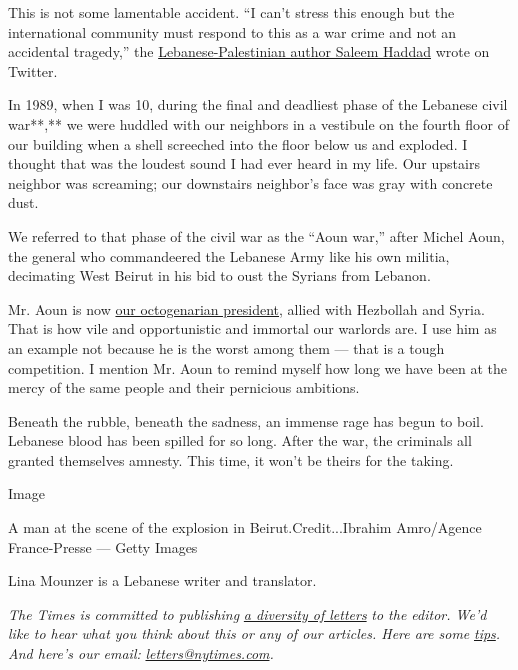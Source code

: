 This is not some lamentable accident. ``I can't stress this enough but
the international community must respond to this as a war crime and not
an accidental tragedy,'' the
\href{https://twitter.com/sysh/status/1290980055544475650}{Lebanese-Palestinian
author Saleem Haddad} wrote on Twitter.

In 1989, when I was 10, during the final and deadliest phase of the
Lebanese civil war**,** we were huddled with our neighbors in a
vestibule on the fourth floor of our building when a shell screeched
into the floor below us and exploded. I thought that was the loudest
sound I had ever heard in my life. Our upstairs neighbor was screaming;
our downstairs neighbor's face was gray with concrete dust.

We referred to that phase of the civil war as the ``Aoun war,'' after
Michel Aoun, the general who commandeered the Lebanese Army like his own
militia, decimating West Beirut in his bid to oust the Syrians from
Lebanon.

Mr. Aoun is now
\href{https://www.nytimes.com/2016/11/01/world/middleeast/michel-aoun-lebanon-president.html}{our
octogenarian president}, allied with Hezbollah and Syria. That is how
vile and opportunistic and immortal our warlords are. I use him as an
example not because he is the worst among them --- that is a tough
competition. I mention Mr. Aoun to remind myself how long we have been
at the mercy of the same people and their pernicious ambitions.

Beneath the rubble, beneath the sadness, an immense rage has begun to
boil. Lebanese blood has been spilled for so long. After the war, the
criminals all granted themselves amnesty. This time, it won't be theirs
for the taking.

Image

A man at the scene of the explosion in Beirut.Credit...Ibrahim
Amro/Agence France-Presse --- Getty Images

Lina Mounzer is a Lebanese writer and translator.

\emph{The Times is committed to publishing}
\href{https://www.nytimes.com/2019/01/31/opinion/letters/letters-to-editor-new-york-times-women.html}{\emph{a
diversity of letters}} \emph{to the editor. We'd like to hear what you
think about this or any of our articles. Here are some}
\href{https://help.nytimes.com/hc/en-us/articles/115014925288-How-to-submit-a-letter-to-the-editor}{\emph{tips}}\emph{.
And here's our email:}
\href{mailto:letters@nytimes.com}{\emph{letters@nytimes.com}}\emph{.}


